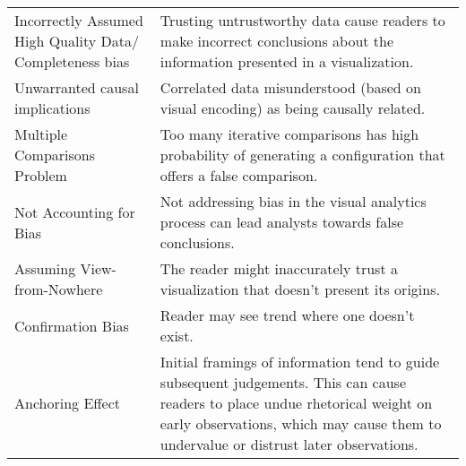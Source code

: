 \begin{table*}[]
\begin{tabular}{p{5cm}p{12cm}}
   \rowcolor{colord}\multirow{7}{0em}{\hspace{-0.6cm}\rotatebox{90}{\normalsize{Reading}}}Incorrectly Assumed High Quality Data/ Completeness bias & Trusting untrustworthy data cause readers to make incorrect conclusions about the information presented in a visualization. \cite{mayrTrust2019, sacha2015role}\\
 \rowcolor{colord-opaque}Unwarranted causal implications & Correlated data misunderstood (based on visual encoding) as being causally related. \cite{xiong2019illusion, few2019loom}\\
 \rowcolor{colord}Multiple Comparisons Problem & Too many iterative comparisons has high probability of generating a configuration that offers a false comparison. \cite{pu2018garden, zgraggen2018investigating}\\
 \rowcolor{colord-opaque}Not Accounting for Bias & Not addressing bias in the visual analytics process can lead analysts towards false conclusions. \cite{wall2017warning}\\
 \rowcolor{colord}Assuming View-from-Nowhere & The reader might inaccurately trust a visualization that doesn't present its origins. \cite{dignazio2019draft, d2016feminist}\\
 \rowcolor{colord-opaque}Confirmation Bias & Reader may see trend where one doesn't exist. \cite{valdez2017framework, few2019loom}\\
 \rowcolor{colord}Anchoring Effect  & Initial framings of information tend to guide subsequent judgements. This can cause readers to place undue rhetorical weight on early observations, which may cause them to undervalue or distrust later observations.  \cite{ritchie2019lie, hullman2011visualization}\\
\end{tabular}
\label{table:mirage-table}
\end{table*}
